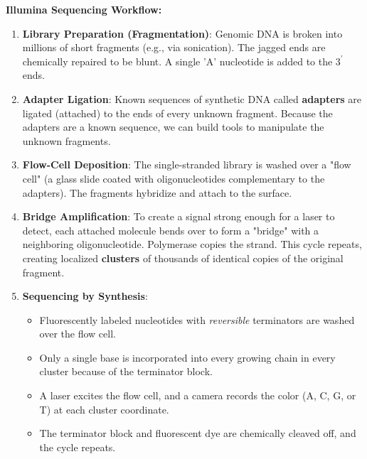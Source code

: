 \textbf{Illumina Sequencing Workflow:}
\begin{enumerate}
  \item \textbf{Library Preparation (Fragmentation)}: Genomic DNA is broken into millions of short fragments (e.g., via sonication). The jagged ends are chemically repaired to be blunt. A single 'A' nucleotide is added to the $3^{\prime}$ ends.
  \item \textbf{Adapter Ligation}: Known sequences of synthetic DNA called \textbf{adapters} are ligated (attached) to the ends of every unknown fragment. Because the adapters are a known sequence, we can build tools to manipulate the unknown fragments.
  \item \textbf{Flow-Cell Deposition}: The single-stranded library is washed over a "flow cell" (a glass slide coated with oligonucleotides complementary to the adapters). The fragments hybridize and attach to the surface.
  \item \textbf{Bridge Amplification}: To create a signal strong enough for a laser to detect, each attached molecule bends over to form a "bridge" with a neighboring oligonucleotide. Polymerase copies the strand. This cycle repeats, creating localized \textbf{clusters} of thousands of identical copies of the original fragment.
  \item \textbf{Sequencing by Synthesis}: 
    \begin{itemize}
        \item Fluorescently labeled nucleotides with \textit{reversible} terminators are washed over the flow cell. 
        \item Only a single base is incorporated into every growing chain in every cluster because of the terminator block.
        \item A laser excites the flow cell, and a camera records the color (A, C, G, or T) at each cluster coordinate.
        \item The terminator block and fluorescent dye are chemically cleaved off, and the cycle repeats.
    \end{itemize}
\end{enumerate}



